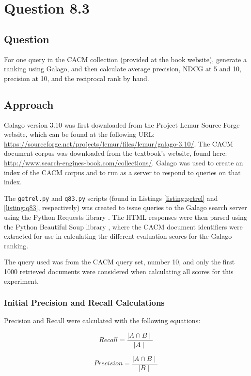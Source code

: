 \section{Question 8.3}


\subsection{Question}
For one query in the CACM collection (provided at the book website), generate a ranking using Galago, and then calculate average precision, NDCG at 5 and 10, precision at 10, and the reciprocal rank by hand.


\subsection{Approach}
Galago version 3.10 was first downloaded from the Project Lemur Source Forge website, which can be found at the following URL: \url{https://sourceforge.net/projects/lemur/files/lemur/galago-3.10/}.  The CACM document corpus was downloaded from the textbook's website, found here: \url{http://www.search-engines-book.com/collections/}.  Galago was used to create an index of the CACM corpus and to run as a server to respond to queries on that index.

The \texttt{getrel.py} and \texttt{q83.py} scripts (found in Listings \ref{listing:getrel} and \ref{listing:q83}, respectively) was created to issue queries to the Galago search server using the Python Requests library \cite{py:requests}.  The HTML responses were then parsed using the Python Beautiful Soup library \cite{py:beautifulsoup}, where the CACM document identifiers were extracted for use in calculating the different evaluation scores for the Galago ranking.

The query used was from the CACM query set, number 10, and only the first 1000 retrieved documents were considered when calculating all scores for this experiment.


\subsubsection{Initial Precision and Recall Calculations}
Precision and Recall were calculated with the following equations:

\begin{equation}
\nonumber
Recall = \frac{\mid A \cap B \mid}{\mid A \mid}
\end{equation}

\begin{equation}
\nonumber
Precision = \frac{\mid A \cap B \mid}{\mid B \mid}
\end{equation}

